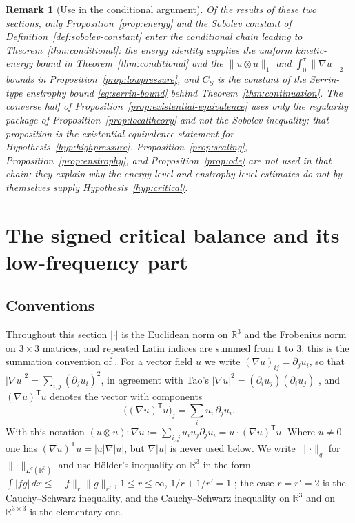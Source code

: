 \documentclass[11pt]{article}
\newtheorem{remark}[theorem]{Remark}
\theoremstyle{definition}
\theoremstyle{plain}
\newcommand{\R}{\mathbb R}
\newcommand{\norm}[1]{\lVert #1\rVert}
\begin{document}
\begin{remark}[Use in the conditional argument]\label{rem:usage}
Of the results of these two sections, only Proposition~\ref{prop:energy}
and the Sobolev constant of Definition~\ref{def:sobolev-constant} enter the
conditional chain leading to
Theorem~\ref{thm:conditional}: the energy identity supplies the uniform
kinetic-energy bound in Theorem~\ref{thm:conditional} and the
$\|u\otimes u\|_1$ and $\int_0^\tau\|\nabla u\|_2$ bounds in
Proposition~\ref{prop:lowpressure}, and $C_S$ is the constant of the
Serrin-type enstrophy bound \eqref{eq:serrin-bound} behind
Theorem~\ref{thm:continuation}.  The converse half of
Proposition~\ref{prop:existential-equivalence} uses only the regularity
package of Proposition~\ref{prop:localtheory} and not the Sobolev
inequality; that proposition is the existential-equivalence statement for
Hypothesis~\ref{hyp:highpressure}.  Proposition~\ref{prop:scaling},
Proposition~\ref{prop:enstrophy}, and Proposition~\ref{prop:ode} are not
used in that chain; they explain why the energy-level and enstrophy-level
estimates do not by themselves supply Hypothesis~\ref{hyp:critical}.
\end{remark}

\section{The signed critical balance and its low-frequency part}
\label{sec:pressure}

\subsection*{Conventions}

Throughout this section $|\cdot|$ is the Euclidean norm on $\R^3$ and the
Frobenius norm on $3\times3$ matrices, and repeated Latin indices are summed
from $1$ to $3$; this is the summation convention of \cite[p.~35]{Tao2013}.
For a vector field $u$ we write $(\nabla u)_{ij}=\partial_ju_i$, so that
$|\nabla u|^2=\sum_{i,j}(\partial_ju_i)^2$, in agreement with Tao's
$|\nabla u|^2=(\partial_iu_j)(\partial_iu_j)$ \cite[p.~35]{Tao2013}, and
$(\nabla u)^{\mathsf T}u$ denotes the vector with components
\[
 \bigl((\nabla u)^{\mathsf T}u\bigr)_j=\sum_i u_i\,\partial_ju_i .
\]
With this notation $(u\otimes u):\nabla u:=\sum_{i,j}u_iu_j\partial_ju_i
=u\cdot(\nabla u)^{\mathsf T}u$.  Where $u\neq0$ one has
$(\nabla u)^{\mathsf T}u=|u|\nabla|u|$, but $\nabla|u|$ is never used below.
We write $\norm\cdot_q$ for $\norm\cdot_{L^q(\R^3)}$ and use H\"older's
inequality on $\R^3$ in the form
$\int|fg|\,dx\leq\norm f_r\norm g_{r'}$, $1\leq r\leq\infty$, $1/r+1/r'=1$
\cite[Ch.~3]{Rudin1987}; the case $r=r'=2$ is the Cauchy--Schwarz
inequality, and the Cauchy--Schwarz inequality on $\R^3$ and on
$\R^{3\times3}$ is the elementary one.
\end{document}
